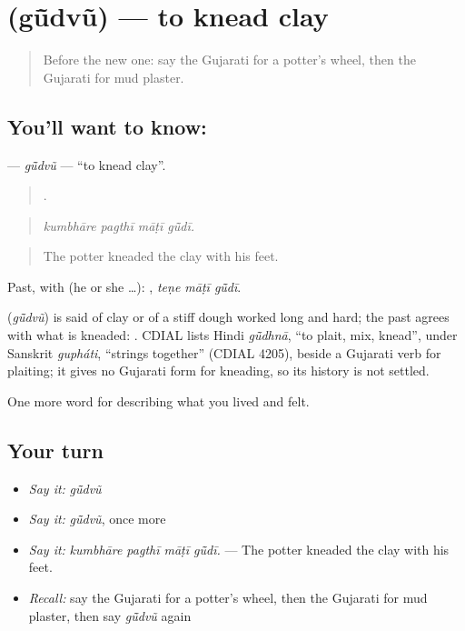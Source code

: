 \section[\texorpdfstring{\gu{ગૂંદવું} (gū̃dvũ)}{ગૂંદવું (gū̃dvũ)}]{ (gū̃dvũ) — to knead clay}

\label{lesson:GU-C504-gudvu}



\begin{quote}
Before the new one: say the Gujarati for a potter's wheel, then the Gujarati for mud plaster.
\end{quote}

\subsection*{You'll want to know: }
\textbf{} — \emph{gū̃dvũ} — \textquotedblleft{}to knead clay\textquotedblright{}.

\begin{quote}
   .
\end{quote}

\begin{quote}
\emph{kumbhāre pagthī māṭī gū̃dī.}
\end{quote}

\begin{quote}
The potter kneaded the clay with his feet.
\end{quote}

Past, with  (he or she …):   , \emph{teṇe māṭī gū̃dī}.

\begin{cousinweb}
\textbf{} (\emph{gū̃dvũ}) is said of clay or of a stiff dough worked long and hard; the past agrees with what is kneaded: \textbf{ }. CDIAL lists Hindi \emph{gū̃dhnā}, \textquotedblleft{}to plait, mix, knead\textquotedblright{}, under Sanskrit \emph{gupháti}, \textquotedblleft{}strings together\textquotedblright{} (CDIAL 4205), beside a Gujarati verb for plaiting; it gives no Gujarati form for kneading, so its history is not settled.
\end{cousinweb}

\begin{grammarlens}[title={What you've built}]
One more word for describing what you lived and felt.
\end{grammarlens}

\subsection*{Your turn}
\begin{itemize}
\raggedright
  \item \emph{Say it:} \emph{gū̃dvũ}
  \item \emph{Say it:} \emph{gū̃dvũ}, once more
  \item \emph{Say it:} \emph{kumbhāre pagthī māṭī gū̃dī.} — The potter kneaded the clay with his feet.
  \item \emph{Recall:} say the Gujarati for a potter's wheel, then the Gujarati for mud plaster, then say \emph{gū̃dvũ} again
\end{itemize}

